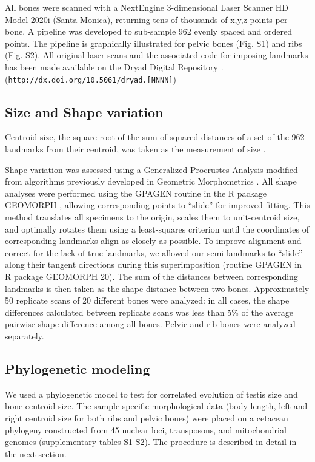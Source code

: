 \documentclass[12pt]{article}
\newcommand{\href}[2]{#2 (\texttt{#1})}
\begin{document}
All bones were scanned with a NextEngine 3-dimensional Laser Scanner HD Model 2020i (Santa Monica), returning tens
of thousands of x,y,z points per bone. A pipeline was developed to sub-sample 962
evenly spaced and ordered points. The pipeline is graphically illustrated for pelvic
bones (Fig. S1) and ribs (Fig. S2). All original laser scans and the associated code for
imposing landmarks has been made available on the Dryad Digital Repository
\href{http://dx.doi.org/10.5061/dryad.[NNNN]}.

\subsection*{Size and Shape variation}

Centroid size, the square root of the sum of squared distances of a set of the 962
landmarks from their centroid, was taken as the measurement of size \citep{zelditch2004}.

Shape variation was assessed using a Generalized Procrustes Analysis modified
from algorithms previously developed in Geometric Morphometrics \citep{bookstein1997,mitteroecker2009}. All shape
analyses were performed using the GPAGEN routine in the R package GEOMORPH \citep{adams2012},
allowing corresponding points to “slide” for improved fitting. This method translates all
specimens to the origin, scales them to unit-centroid size, and optimally rotates them
using a least-squares criterion until the coordinates of corresponding landmarks align as
closely as possible. To improve alignment and correct for the lack of true landmarks,
we allowed our semi-landmarks to “slide” along their tangent directions during this
superimposition (routine GPAGEN in R package GEOMORPH 20). The sum of the
distances between corresponding landmarks is then taken as the shape distance
between two bones. Approximately 50 replicate scans of 20 different bones were
analyzed: in all cases, the shape differences calculated between replicate scans was
less than 5\% of the average pairwise shape difference among all bones. Pelvic and rib
bones were analyzed separately.

\subsection*{Phylogenetic modeling}

We used a phylogenetic model to test for correlated evolution of testis size and bone
centroid size. The sample-specific morphological data (body length, left and right
centroid size for both ribs and pelvic bones) were placed on a cetacean phylogeny
constructed from 45 nuclear loci, transposons, and mitochondrial genomes \citep{mcgowen2009} (supplementary tables S1-S2).  The procedure is described in detail in the next section.
\end{document}
